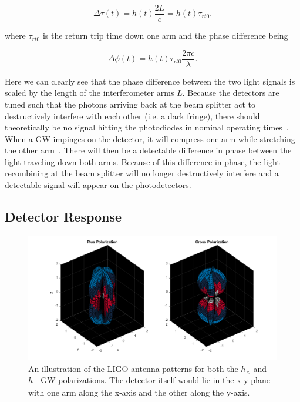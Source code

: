 \begin{equation}
    \Delta \tau(t) = h(t) \frac{2L}{c} = h(t) \tau_{rt0}.
\end{equation}

%
%
where $\tau_{rt0}$ is the return trip time down 
one arm and the phase difference being 

\begin{equation}
    \Delta \phi(t) = h(t) \tau_{rt0} \frac{2\pi c}{\lambda}.
\end{equation}

Here we can clearly see that the phase difference 
between the two light signals is scaled by the 
length of the interferometer arms $L$. Because the 
detectors are tuned such that the photons arriving 
back at the beam splitter act to destructively 
interfere with each other (i.e. a dark fringe), there should theoretically 
be no signal hitting the photodiodes in nominal operating times~. When a \ac{GW} 
impinges on the detector, it will compress one arm 
while stretching the other arm~. There will then be a 
detectable difference in phase between the light traveling 
down both arms. Because of this difference in phase, the 
light recombining at the beam splitter will no longer 
destructively interfere and a detectable signal will appear 
on the photodetectors.

\subsection{Detector Response}

\begin{figure}
    \centering
    \includegraphics[width=\linewidth]{figures/peanut.png}
    \caption[Illustration of the \ac{LIGO} antenna patterns for both the $h_\times$ and $h_+$ \ac{GW} polarizations]{An illustration of the \ac{LIGO} antenna patterns for both the $h_\times$ and $h_+$ \ac{GW} polarizations. The detector itself would lie in the x-y plane with one arm along the x-axis and the other along the y-axis.}
    \label{fig:gw_plus_cross}
\end{figure}

